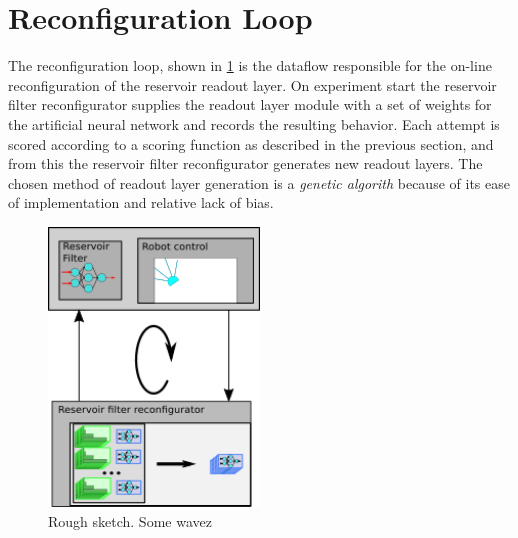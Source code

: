 \section{Reconfiguration Loop}
The reconfiguration loop, shown in \ref{figReconfLoop} is the dataflow
responsible for the on-line reconfiguration of the reservoir readout layer.
On experiment start the reservoir filter reconfigurator supplies the readout
layer module with a set of weights for the artificial neural network and records
the resulting behavior.
Each attempt is scored according to a scoring function as described in the
previous section, and from this the reservoir filter reconfigurator generates
new readout layers.
The chosen method of readout layer generation is a \emph{genetic algorith}
because of its ease of implementation and relative lack of bias.
\begin{figure}[h!]
  \centering
  \includegraphics[width=0.5\textwidth]{fig/reconfigLoop.png}
  \caption{Rough sketch.
    Some wavez
  }
  \label{figReconfLoop}
\end{figure}
\cleardoublepage

